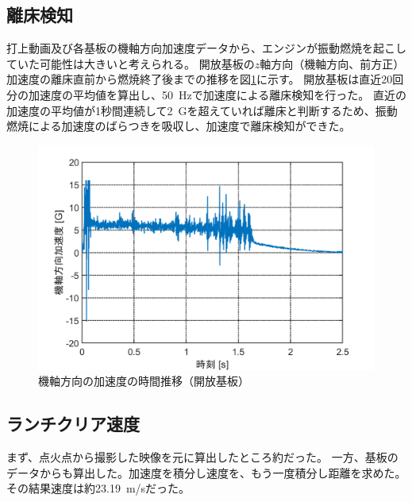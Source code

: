 \documentclass[a4paper,11pt,titlepage,uplatex]{jsarticle}
\begin{document}
\subsection{離床検知}
打上動画及び各基板の機軸方向加速度データから、エンジンが振動燃焼を起こしていた可能性は大きいと考えられる。
開放基板の$z$軸方向（機軸方向、前方正）加速度の離床直前から燃焼終了後までの推移を図\ref{fig:az_data}に示す。
開放基板は直近20回分の加速度の平均値を算出し、\SI{50}{Hz}で加速度による離床検知を行った。
直近の加速度の平均値が1秒間連続して\SI{2}{G}を超えていれば離床と判断するため、振動燃焼による加速度のばらつきを吸収し、加速度で離床検知ができた。
\begin{figure}[H]
	\centering
	\includegraphics[width=0.8\linewidth]{pic_avi/59_6axis.png}
	\caption{機軸方向の加速度の時間推移（開放基板）}
	\label{fig:az_data}
\end{figure}

\subsection{ランチクリア速度}
まず、点火点から撮影した映像を元に算出したところ約だった。
一方、基板のデータからも算出した。加速度を積分し速度を、もう一度積分し距離を求めた。
その結果速度は約\SI{23.19}{m/s}だった。
\end{document}

